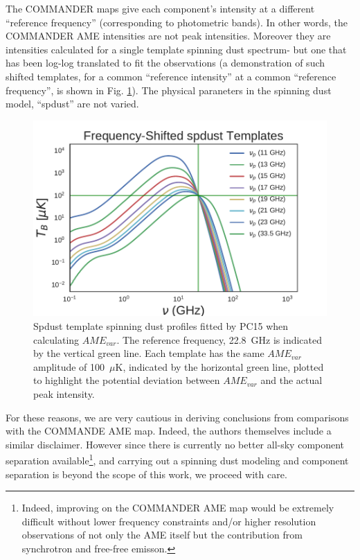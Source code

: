         The COMMANDER maps give each component's intensity at a different ``reference frequency'' (corresponding to photometric bands). In other words, the COMMANDER AME intensities are not peak intensities. Moreover they are intensities calculated for a single template spinning dust spectrum- but one that has been log-log translated to fit the observations (a demonstration of such shifted templates, for a common ``reference intensity'' at a common ``reference frequency'', is shown in Fig. \ref{fig:AME_commander_freqshift_templ}). The physical paraneters in the spinning dust model, ``spdust'' are not varied.

        \begin{figure}
          \label{fig:AME_commander_freqshift_templ}
          \includegraphics[width=185mm]{../Plots/ch_datasources/AME_commander_freqshift_templ.pdf}
          \centering
          \caption{Spdust template spinning dust profiles fitted by PC15 when calculating $AME_{var}$.  The reference frequency, 22.8~GHz is indicated by the vertical green line. Each template has the same $AME_{var}$ amplitude of 100~$\mu$K, indicated by the horizontal green line, plotted to highlight the potential deviation between $AME_{var}$ and the actual peak intensity. }
        \end{figure}

        For these reasons, we are very cautious in deriving conclusions from comparisons with the COMMANDE AME map. Indeed, the authors themselves include a similar disclaimer. However since there is currently no better all-sky component separation available\footnote{Indeed, improving on the COMMANDER AME map would be extremely difficult without lower frequency constraints and/or higher resolution observations of not only the AME itself but the contribution from synchrotron and free-free emisson.}, and carrying out a spinning dust modeling and component separation is beyond the scope of this work, we proceed with care.


